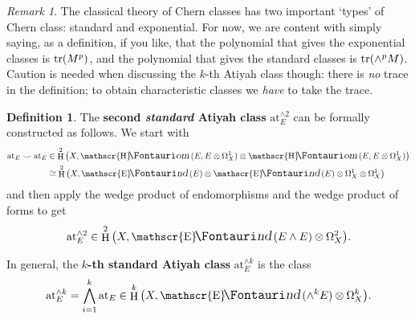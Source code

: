 \documentclass[11pt,fleqn]{article}
\theoremstyle{plain}
\theoremstyle{definition}
\newtheorem{definition}[theorem]{Definition}
\theoremstyle{remark}
\newtheorem{remark}[theorem]{Remark}
\numberwithin{equation}{theorem}
\newcommand{\at}{\mathrm{at}}
\newcommand{\stanat}[1]{\at^{\wedge#1}}
\newcommand{\define}[1]{\textbf{#1}}
\DeclareMathOperator{\HH}{H}
\DeclareMathOperator{\sheafhom}{\mathscr{H}\textup{\kern -2.5pt {\large\Fontauri\slshape om}}\,}
\DeclareMathOperator{\sheafend}{\mathscr{E}\textup{\kern -2pt {\large\Fontauri\slshape nd}}\,}
\begin{document}
        \begin{remark}
            The classical theory of Chern classes has two important `types' of Chern class: standard and exponential.
            For now, we are content with simply saying, as a definition, if you like, that the polynomial that gives the exponential classes is $\tr(M^p)$, and the polynomial that gives the standard classes is $\tr(\wedge^pM)$.
            Caution is needed when discussing the $k$-th Atiyah class though: there is \emph{no} trace in the definition; to obtain characteristic classes we \emph{have} to take the trace.
        \end{remark}

        \begin{definition}\label{definition:second-standard-atiyah-class}
            The \define{second \emph{standard} Atiyah class} $\stanat{2}_E$ can be formally constructed as follows.
            We start with
            \begin{align*}
                \at_E\smile\at_E &\in \HH^2\big(X,\sheafhom(E,E\otimes\Omega_X^1)\otimes\sheafhom(E,E\otimes\Omega_X^1)\big)\\
                &\cong \HH^2\big(X,\sheafend(E)\otimes\sheafend(E)\otimes\Omega_X^1\otimes\Omega_X^1\big)
            \end{align*}
            and then apply the wedge product of endomorphisms and the wedge product of forms to get
            \begin{equation*}
                \stanat{2}_E \in \HH^2\big(X,\sheafend(E\wedge E)\otimes\Omega_X^2\big).
            \end{equation*}
            
            In general, the \define{$k$-th standard Atiyah class} $\stanat{k}_E$ is the class
            \begin{equation*}
                \stanat{k}_E=\bigwedge_{i=1}^k\at_E \in \HH^k\big(X,\sheafend(\wedge^kE)\otimes\Omega_X^k\big).
            \end{equation*}
        \end{definition}
\end{document}
